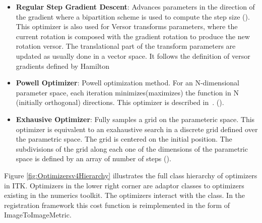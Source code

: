 \begin{itemize}
\item \textbf{Regular Step Gradient Descent}: Advances parameters in the
direction of the gradient where a bipartition scheme is used to compute
the step size ().
This optimizer is also used for Versor transforms parameters, where the
current rotation is composed with the gradient rotation to produce the
new rotation versor. The translational part of the transform parameters
are updated as usually done in a vector space. It follows the definition
of versor gradients defined by Hamilton~\cite{Hamilton1866}

\item \textbf{Powell Optimizer}: Powell optimization method.  For an
N-dimensional parameter space, each iteration minimizes(maximizes) the function
in N (initially orthogonal) directions. This optimizer is described
in~\cite{Press1992}.  ().

\item \textbf{Exhausive Optimizer}: Fully samples a grid on the parameteric space.
This optimizer is equivalent to an exahaustive search in a discrete grid defined
over the parametric space. The grid is centered on the initial position. The
subdivisions of the grid along each one of the dimensions of the parametric space
is defined by an array of number of steps
().

\end{itemize}

Figure \ref{fig:Optimizersv4Hierarchy} illustrates the full class hierarchy of
optimizers in ITK. Optimizers in the lower right corner are adaptor classes
to optimizers existing in the  numerics toolkit. The optimizers
interact with the  class. In the registration framework
this cost function is reimplemented in the form of ImageToImageMetric.






